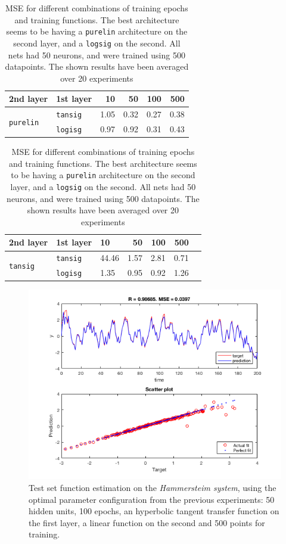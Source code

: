 \documentclass[a4paper, 10pt]{article}
\begin{document}
  \begin{table}
    \centering
    \begin{tabular}{@{}llrrrr@{}}
      \toprule
      2nd layer& 1st layer& 10 & 50 & 100 & 500 \\
      \midrule %
      \multirow{2}{*}{\texttt{purelin}} & \texttt{tansig}  & 1.05  &  0.32  &
                                                             0.27  &  0.38 \\
      & \texttt{logisg}  & 0.97  &  0.92  &  0.31  &  0.43 \\
      \bottomrule
    \end{tabular}
    \hfill
    \begin{tabular}{@{}lllrrrr@{}}
      \toprule
      2nd layer& 1st layer& 10 & 50 & 100 & 500 \\
      \midrule %
      \multirow{2}{*}{\texttt{tansig}} & \texttt{tansig}  & 44.46 &  1.57  &
                                                             2.81  &  0.71 \\
      & \texttt{logisg}  & 1.35  &  0.95  &  0.92  &  1.26 \\
      \bottomrule
    \end{tabular}
    \caption{MSE for different combinations of training epochs and training
    functions. The best architecture seems to be having a \texttt{purelin} 
    architecture on the second layer, and a \texttt{logsig} on the second. All
    nets had 50 neurons, and were trained using 500 datapoints. The shown results
    have been averaged over 20 experiments}
    \label{tab:l2_elman_transfers}
  \end{table}

  \begin{figure}[htpb]
    \centering
    \includegraphics[width=0.8\linewidth]{lab2/elman_optimal.png}
    \caption{Test set function estimation on the \emph{Hammersteim system}, using
    the optimal parameter configuration from the previous experiments: 50 hidden
    units, 100 epochs, an hyperbolic tangent transfer function on the first layer,
    a linear function on the second and 500 points for training.}
    \label{fig:l2_optimal_elman}
  \end{figure}
\end{document}

